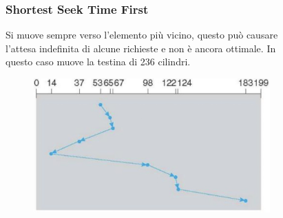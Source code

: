 \begin{figure}[H]
    \centering
    \begin{minipage}{0.5\textwidth}
        \subsubsection*{Shortest Seek Time First}
        Si muove sempre verso l'elemento più vicino, questo può causare l'attesa indefinita di alcune richieste e non è ancora ottimale. In questo caso muove la testina di 236 cilindri.
    \end{minipage}
    \hfill
    \begin{minipage}{0.4\textwidth}
        \begin{figure}[H]
            \centering
            \includegraphics[width=1\linewidth]{assets/sstf.jpg}
        \end{figure}
    \end{minipage}
\end{figure}

